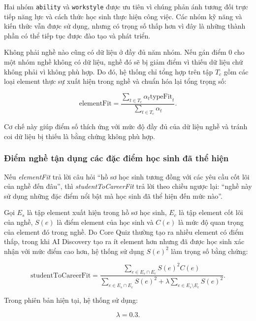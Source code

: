 Hai nhóm \texttt{ability} và \texttt{workstyle} được ưu tiên vì chúng phản ánh tương đối trực tiếp năng lực và cách thức học sinh thực hiện công việc. Các nhóm kỹ năng và kiến thức vẫn được sử dụng, nhưng có trọng số thấp hơn vì đây là những thành phần có thể tiếp tục được đào tạo và phát triển.

Không phải nghề nào cũng có dữ liệu ở đầy đủ năm nhóm. Nếu gán điểm 0 cho một nhóm nghề không có dữ liệu, nghề đó sẽ bị giảm điểm vì thiếu dữ liệu chứ không phải vì không phù hợp. Do đó, hệ thống chỉ tổng hợp trên tập $T_c$ gồm các loại element thực sự xuất hiện trong nghề và chuẩn hóa lại tổng trọng số:

\begin{equation}
	\text{elementFit}
	=
	\frac{
		\sum\limits_{t \in T_c}
		\alpha_t \text{typeFit}_t
	}{
		\sum\limits_{t \in T_c}\alpha_t
	}.
\end{equation}

Cơ chế này giúp điểm số thích ứng với mức độ đầy đủ của dữ liệu nghề và tránh coi dữ liệu bị thiếu là bằng chứng không phù hợp.

\subsubsection{Điểm nghề tận dụng các đặc điểm học sinh đã thể hiện}

Nếu \textit{elementFit} trả lời câu hỏi ``hồ sơ học sinh tương đồng với các yêu cầu cốt lõi của nghề đến đâu'', thì \textit{studentToCareerFit} trả lời theo chiều ngược lại: ``nghề này sử dụng những đặc điểm nổi bật mà học sinh đã thể hiện đến mức nào''.

Gọi $E_s$ là tập element xuất hiện trong hồ sơ học sinh, $E_c$ là tập element cốt lõi của nghề, $S(e)$ là điểm element của học sinh và $C(e)$ là mức độ quan trọng của element đó trong nghề. Do Core Quiz thường tạo ra nhiều element có điểm thấp, trong khi AI Discovery tạo ra ít element hơn nhưng đã được học sinh xác nhận với mức điểm cao hơn, hệ thống sử dụng $S(e)^2$ làm trọng số bằng chứng:

\begin{equation}
	\text{studentToCareerFit}
	=
	\frac{
		\sum\limits_{e \in E_s \cap E_c}
		S(e)^2 C(e)
	}{
		\sum\limits_{e \in E_s \cap E_c}S(e)^2
		+
		\lambda
		\sum\limits_{e \in E_s \setminus E_c}S(e)^2
	}.
\end{equation}

Trong phiên bản hiện tại, hệ thống sử dụng:

\begin{equation}
	\lambda=0.3.
\end{equation}

